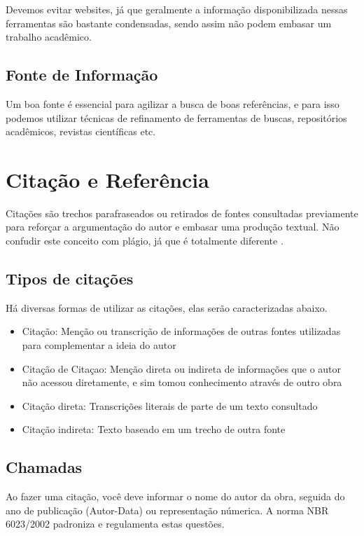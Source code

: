 \documentclass[12pt]{article}
\begin{document}
	Devemos evitar websites, já que geralmente a informação disponibilizada nessas ferramentas são bastante condensadas,
	sendo assim não podem embasar um trabalho acadêmico.

\subsection{Fonte de Informação}

		Um boa fonte é essencial para agilizar a busca de boas referências, e para isso podemos utilizar técnicas de refinamento de ferramentas
		de buscas, repositórios acadêmicos, revistas científicas etc.
		 
			
	


\section{Citação e Referência}

Citações são trechos parafraseados ou retirados de fontes consultadas previamente para
reforçar a argumentação do autor e embasar uma produção textual. Não confudir este conceito com plágio, já que é totalmente diferente \cite{abnt:02}.

\subsection{Tipos de citações}
Há diversas formas de utilizar as citações, elas serão
caracterizadas abaixo.

\begin{itemize}
	\item Citação: Menção ou transcrição de informações de outras fontes utilizadas para complementar a ideia do autor
	\item Citação de Citaçao: Menção direta ou indireta de informações que o autor não acessou 
		  diretamente, e sim tomou conhecimento através de outro obra
	\item Citação direta: Transcrições literais de parte de um texto consultado
	\item Citação indireta: Texto baseado em um trecho de outra fonte 
\end{itemize}

\subsection{Chamadas}

Ao fazer uma citação, você deve informar o nome do autor da obra, seguida do ano de publicação (Autor-Data) ou representação númerica.
A norma NBR 6023/2002 padroniza e regulamenta estas questões.
\end{document}
